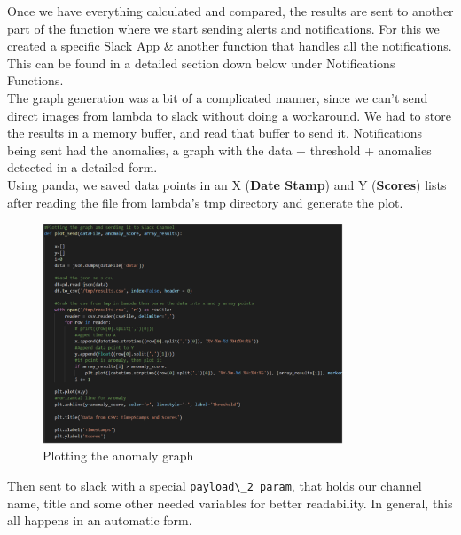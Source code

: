 Once we have everything calculated and compared, the results are sent to another part of the function where we start sending alerts and notifications. For this we created a specific Slack App \& another function that handles all the notifications. This can be found in a detailed section down below under Notifications Functions.\\

The graph generation was a bit of a complicated manner, since we can’t send direct images from lambda to slack without doing a workaround. We had to store the results in a memory buffer, and read that buffer to send it. Notifications being sent had the anomalies, a graph with the data + threshold + anomalies detected in a detailed form.\\

Using panda, we saved data points in an X (\textbf{Date Stamp}) and Y (\textbf{Scores}) lists after reading the file from lambda’s tmp directory and generate the plot.
\begin{figure}[h!]
    \centering
    \includegraphics[width=0.8\textwidth]{images/graph-plotting.png}
    \caption{Plotting the anomaly graph}
    \label{fig:graph_plotting}
\end{figure}
Then sent to slack with a special \verb|payload\_2 param|, that holds our channel name, title and some other needed variables for better readability. In general, this all happens in an automatic form.